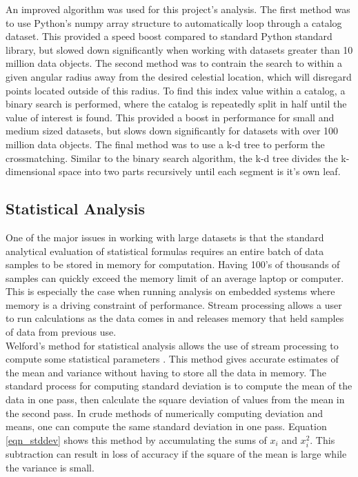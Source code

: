 \documentclass[11pt,sigconf]{acmart}
\begin{document}
An improved algorithm was used for this project's analysis. The first method was to
use Python's numpy array structure to automatically loop through a catalog dataset. This
provided a speed boost compared to standard Python standard library, but slowed down
significantly when working with datasets greater than 10 million data objects. The second
method was to contrain the search to within a given angular radius away from the desired
celestial location, which will disregard points located outside of this radius. To find
this index value within a catalog, a binary search is performed, where the catalog is 
repeatedly split in half until the value of interest is found. This provided a boost in
performance for small and medium sized datasets, but slows down significantly for datasets 
with over 100 million data objects. The final method was to use a k-d tree to perform
the crossmatching. Similar to the binary search algorithm, the k-d tree divides the 
k-dimensional space into two parts recursively until each segment is it's own leaf. 








\subsection{Statistical Analysis}
One of the major issues in working with large datasets is that the standard analytical
evaluation of statistical formulas requires an entire batch of data samples to
be stored in memory for computation. Having 100's of thousands of samples can
quickly exceed the memory limit of an average laptop or computer. This is especially
the case when running analysis on embedded systems where memory is a driving constraint
of performance. Stream processing allows a user to run calculations as the data comes in
and releases memory that held samples of data from previous use.
\\
Welford's method for statistical analysis allows the use of stream processing to
compute some statistical parameters \cite{welford}. This method gives accurate estimates of the 
mean and variance without having to store all the data in memory. The standard process for computing
standard deviation is to compute the mean of the data in one pass, then calculate the square
deviation of values from the mean in the second pass. In crude methods of numerically computing
deviation and means, one can compute the same standard deviation in one pass. Equation \ref{eqn_stddev} shows
this method by accumulating the sums of $x_i$ and $x_{i}^{2}$. This subtraction can result in 
loss of accuracy if the square of the mean is large while the variance is small.
\end{document}
